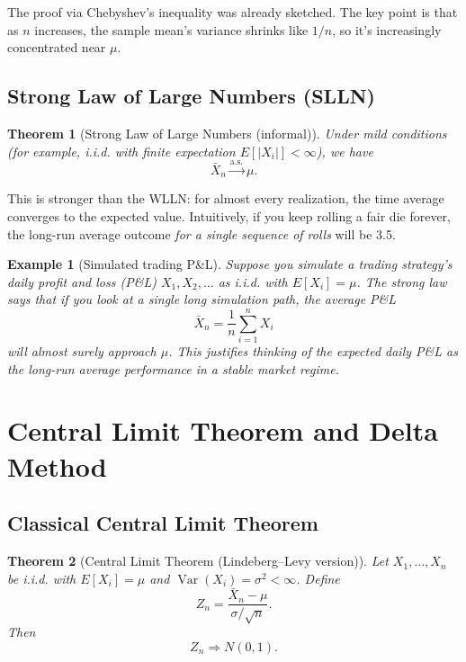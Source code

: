 \documentclass[11pt,a4paper]{article}
\newtheorem{theorem}{Theorem}[section]
\newtheorem{example}{Example}[section]
\begin{document}
The proof via Chebyshev's inequality was already sketched. 
The key point is that as $n$ increases, the sample mean's variance shrinks like $1/n$, so it's increasingly concentrated near $\mu$.

\subsection{Strong Law of Large Numbers (SLLN)}

\begin{theorem}[Strong Law of Large Numbers (informal)]
Under mild conditions (for example, i.i.d. with finite expectation $E[|X_i|] < \infty$), we have
\[
\bar{X}_n \xrightarrow{\text{a.s.}} \mu.
\]
\end{theorem}

This is stronger than the WLLN: for almost every realization, the time average converges to the expected value. 
Intuitively, if you keep rolling a fair die forever, the long-run average outcome \emph{for a single sequence of rolls} will be 3.5.

\begin{example}[Simulated trading P\&L]
Suppose you simulate a trading strategy's daily profit and loss (P\&L) $X_1, X_2, \dots$ as i.i.d. with $E[X_i]=\mu$. 
The strong law says that if you look at a single long simulation path, the average P\&L
\[
\bar{X}_n = \frac{1}{n}\sum_{i=1}^n X_i
\]
will almost surely approach $\mu$. 
This justifies thinking of the expected daily P\&L as the long-run average performance in a stable market regime.

\end{example}

\newpage

\section{Central Limit Theorem and Delta Method}
\label{sec:clt-delta}

\subsection{Classical Central Limit Theorem}

\begin{theorem}[Central Limit Theorem (Lindeberg–Levy version)]
Let $X_1,\dots,X_n$ be i.i.d. with $E[X_i]=\mu$ and $\operatorname{Var}(X_i)=\sigma^2 < \infty$. 
Define
\[
Z_n = \frac{\bar{X}_n - \mu}{\sigma/\sqrt{n}}.
\]
Then
\[
Z_n \Rightarrow N(0,1).
\]
\end{theorem}
\end{document}
